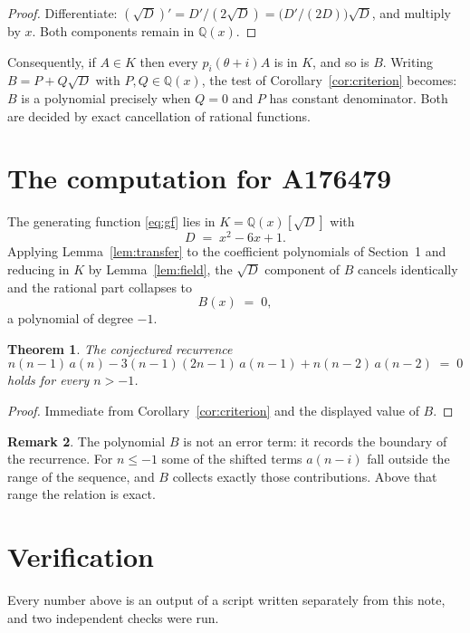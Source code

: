 \documentclass[11pt,a4paper]{article}
\theoremstyle{plain}
\newtheorem{theorem}{Theorem}
\theoremstyle{definition}
\newtheorem{remark}[theorem]{Remark}
\begin{document}
\begin{proof}
Differentiate: $(\sqrt{D})'=D'/(2\sqrt{D})=\bigl(D'/(2D)\bigr)\sqrt{D}$, and multiply by
$x$. Both components remain in $\mathbb{Q}(x)$.
\end{proof}

Consequently, if $A\in K$ then every $p_{i}(\theta+i)A$ is in $K$, and so is $B$. Writing
$B=P+Q\sqrt{D}$ with $P,Q\in\mathbb{Q}(x)$, the test of Corollary~\ref{cor:criterion}
becomes: $B$ is a polynomial precisely when $Q=0$ and $P$ has constant denominator. Both
are decided by exact cancellation of rational functions.

\section{The computation for A176479}

The generating function \eqref{eq:gf} lies in $K=\mathbb{Q}(x)[\sqrt{D}]$ with
\[
D \;=\; x^{2} - 6 x + 1 .
\]
Applying Lemma~\ref{lem:transfer} to the coefficient polynomials of Section~1 and reducing
in $K$ by Lemma~\ref{lem:field}, the $\sqrt{D}$ component of $B$ cancels identically and
the rational part collapses to
\[
B(x)\;=\;0 ,
\]
a polynomial of degree $-1$.

\begin{theorem}
The conjectured recurrence
\[
n \left(n - 1\right)\,a(n) -  3 \left(n - 1\right) \left(2 n - 1\right)\,a(n-1) + n \left(n - 2\right)\,a(n-2) \;=\;0
\]
holds for every $n>-1$.
\end{theorem}

\begin{proof}
Immediate from Corollary~\ref{cor:criterion} and the displayed value of $B$.
\end{proof}

\begin{remark}
The polynomial $B$ is not an error term: it records the boundary of the recurrence. For
$n\le-1$ some of the shifted terms $a(n-i)$ fall outside the range of the sequence,
and $B$ collects exactly those contributions. Above that range the relation is exact.
\end{remark}

\section{Verification}

Every number above is an output of a script written separately from this note, and two
independent checks were run.
\end{document}
